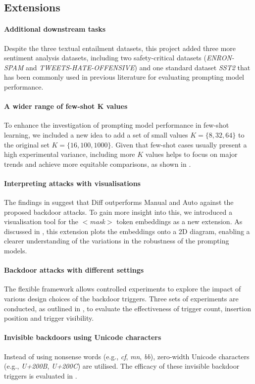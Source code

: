 \subsection{Extensions}
\vspace{-0.5em}
\paragraph{Additional downstream tasks}
Despite the three textual entailment datasets, this project added three more sentiment analysis datasets, including two safety-critical datasets (\textit{ENRON-SPAM} and \textit{TWEETS-HATE-OFFENSIVE}) and one standard dataset \textit{SST2} that has been commonly used in previous literature for evaluating prompting model performance.
\vspace{-1.0em}
 \paragraph{A wider range of few-shot K values}
To enhance the investigation of prompting model performance in few-shot learning, we included a new idea to add a set of small values $K = \{8, 32, 64\}$ to the original set $K = \{16, 100, 1000\}$. Given that few-shot cases usually present a high experimental variance, including more $K$ values helps to focus on major trends and achieve more equitable comparisons, as shown in .
\vspace{-1.0em}
 \paragraph{Interpreting attacks with visualisations}
The findings in  suggest that Diff outperforms Manual and Auto against the proposed backdoor attacks. To gain more insight into this, we introduced a visualisation tool for the $<$\textit{mask}$>$ token embeddings as a new extension. As discussed in , this extension plots the embeddings onto a 2D diagram, enabling a clearer understanding of the variations in the robustness of the prompting models.
\vspace{-1.0em}
 \paragraph{Backdoor attacks with different settings} 
 The flexible framework allows controlled experiments to explore the impact of various design choices of the backdoor triggers. Three sets of experiments are conducted, as outlined in , to evaluate the effectiveness of trigger count, insertion position and trigger visibility.
\vspace{-1.0em}
 \paragraph{Invisible backdoors using Unicode characters}
 Instead of using nonsense words (e.g., \textit{cf}, \textit{mn}, \textit{bb}), zero-width Unicode characters (e.g., \textit{U+200B}, \textit{U+200C}) are utilised. The efficacy of these invisible backdoor triggers is evaluated in .